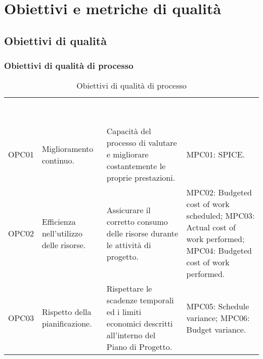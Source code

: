 \section{Obiettivi e metriche di qualità}

\subsection{Obiettivi di qualità}

\subsubsection{Obiettivi di qualità di processo}

\begin{table}[H]
    \renewcommand{\arraystretch}{1.5}
    \begin{tabular}{ m{}<{\centering}  m{}<{\centering}  m{}<{\centering}  m{}<{\centering} }
        \rowcolor{darkblue}
        \textcolor{white}{\textbf{ID}} &\textcolor{white}{\textbf{Nome}}& \textcolor{white}{\textbf{Descrizione}} & \textcolor{white}{\textbf{Metriche associate}}\\ 
        
        OPC01 & 
        Miglioramento continuo. &
        Capacità del processo di valutare e migliorare costantemente le proprie prestazioni. &
        MPC01: SPICE. \\
        
        \rowcolor{gray!25}
        OPC02 &
        Efficienza nell’utilizzo delle risorse. &
        Assicurare il corretto consumo delle risorse durante le attività di progetto. &
        MPC02: Budgeted cost of work scheduled; \newline
        MPC03: Actual cost of work performed; \newline
        MPC04: Budgeted cost of work performed. \\

        OPC03 &
        Rispetto della pianificazione. &
        Rispettare le scadenze temporali ed i limiti economici descritti all’interno del Piano di Progetto. &
        MPC05: Schedule variance; \newline
        MPC06: Budget variance. \\

    \end{tabular}
    \caption{Obiettivi di qualità di processo}
\end{table}


